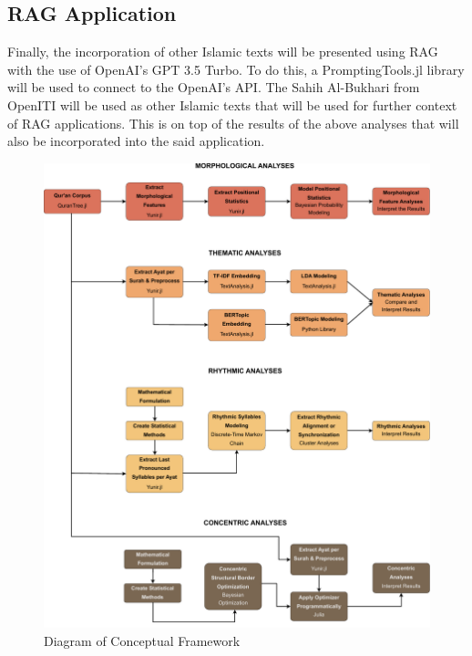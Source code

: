 \subsection{RAG Application}
Finally, the incorporation of other Islamic texts will be presented using RAG with the use of OpenAI's GPT 3.5 Turbo. To do this, a PromptingTools.jl library will be used to connect to the OpenAI's API. The Sahih Al-Bukhari from OpenITI will be used as other Islamic texts that will be used for further context of RAG applications. This is on top of the results of the above analyses that will also be incorporated into the said application. 
\begin{figure}
    \label{fig:conceptual-framework}
    \includegraphics[width=\textwidth]{img/conceptual_framework.pdf}
    \caption{Diagram of Conceptual Framework}
\end{figure}